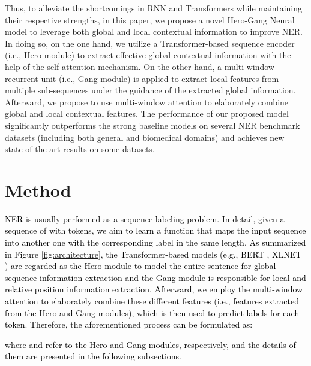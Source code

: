 \documentclass[11pt]{article}
\begin{document}
Thus, to alleviate the shortcomings in RNN and Transformers while maintaining their respective strengths, in this paper, we propose a novel Hero-Gang Neural model to leverage both global and local contextual information to improve NER.
In doing so, on the one hand, we utilize a Transformer-based sequence encoder (i.e., Hero module) to extract effective global contextual information with the help of the self-attention mechanism.
On the other hand, a multi-window recurrent unit (i.e., Gang module) is applied to extract local features from multiple sub-sequences under the guidance of the extracted global information.
Afterward, we propose to use multi-window attention to elaborately combine global and local contextual features.
The performance of our proposed model significantly outperforms the strong baseline models on several NER benchmark datasets (including both general and biomedical domains) and achieves new state-of-the-art results on some datasets.







\section{Method}
\textcolor{black}{
NER is usually performed as a sequence labeling problem.
In detail, given a sequence of  with  tokens, we aim to learn a function that maps the input sequence into another one with the corresponding label  in the same length.
As summarized in Figure \ref{fig:architecture}, the Transformer-based models (e.g., BERT \cite{BERT}, XLNET \cite{yangxlnet}) are regarded as the Hero module to model the entire sentence for global sequence information extraction and the Gang module is responsible for local and relative position information extraction.
Afterward, we employ the multi-window attention to elaborately combine these different features (i.e., features extracted from the Hero and Gang modules), which is then used to predict labels for each token. Therefore, the aforementioned process can be formulated as:

where  and  refer to the Hero and Gang modules, respectively, and the details of them are presented in the following subsections.
}
\end{document}
